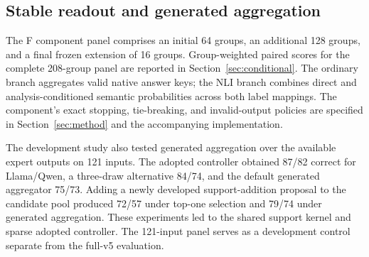 

\subsection{Stable readout and generated aggregation}
The F component panel comprises an initial 64 groups, an additional 128 groups, and a final frozen extension of 16 groups. Group-weighted paired scores for the complete 208-group panel are reported in Section~\ref{sec:conditional}. The ordinary branch aggregates valid native answer keys; the NLI branch combines direct and analysis-conditioned semantic probabilities across both label mappings. The component's exact stopping, tie-breaking, and invalid-output policies are specified in Section~\ref{sec:method} and the accompanying implementation.

The development study also tested generated aggregation over the available expert outputs on 121 inputs. The adopted controller obtained 87/82 correct for Llama/Qwen, a three-draw alternative 84/74, and the default generated aggregator 75/73. Adding a newly developed support-addition proposal to the candidate pool produced 72/57 under top-one selection and 79/74 under generated aggregation. These experiments led to the shared support kernel and sparse adopted controller. The 121-input panel serves as a development control separate from the full-v5 evaluation.
